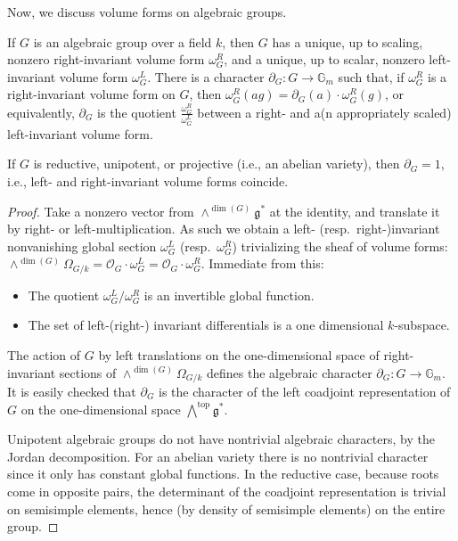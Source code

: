Now, we discuss volume forms on algebraic groups.

\begin{lemma}
 \label{lemma-Haar-volume-form}
If $G$ is an algebraic group over a field $k$, then $G$ has a unique, up to scaling, nonzero right-invariant volume form $\omega_G^R$, and a unique, up to scalar, nonzero left-invariant volume form $\omega_G^L$. There is a character $\partial_G: G\to \mathbb G_m$ such that, if $\omega_G^R$ is a right-invariant volume form on $G$, then $\omega_G^R(ag) = \partial_G(a) \cdot \omega_G^R(g)$, or equivalently, $\partial_G$ is the quotient $\frac{\omega_G^R}{\omega^L_G}$ between a right- and a(n appropriately scaled) left-invariant volume form. 

If $G$ is reductive, unipotent, or projective (i.e., an abelian variety), then $\partial_G = 1$, i.e., left- and right-invariant volume forms coincide.
\end{lemma}

	
\begin{proof}
		Take a nonzero vector from $\wedge^{\dim(G)} \mathfrak{g}^*$ at the identity, and translate it by right- or left-multiplication. As such we obtain a left- (resp.\ right-)invariant nonvanishing global section $\omega_G^L$ (resp.\ $\omega_G^R$) trivializing the sheaf of volume forms:  $\wedge^{\dim(G)}\Omega_{G/k} =   \mathcal{O}_G\cdot \omega_G^L = \mathcal{O}_G\cdot \omega_G^R$. Immediate from this:
		\begin{itemize}
			\item The quotient $\omega_G^L/\omega_G^R$ is an invertible global function. 
			\item The set of left-(right-) invariant differentials is a one dimensional $k$-subspace.
		\end{itemize}

		The action of $G$ by left translations on the one-dimensional space of right-invariant sections of $\wedge^{\dim(G)}\Omega_{G/k}$ defines the algebraic character $\partial_G: G\to \mathbb G_m$. It is easily checked that $\partial_G$ is the character of the left coadjoint representation of $G$ on the one-dimensional space $\bigwedge^{\text{top}} \mathfrak g^*$.
		
		Unipotent algebraic groups do not have nontrivial algebraic characters, by the Jordan decomposition. For an abelian variety there is no nontrivial character since it only has constant global functions. In the reductive case, because roots come in opposite pairs, the determinant of the coadjoint representation is trivial on semisimple elements, hence (by density of semisimple elements) on the entire group.
\end{proof}

